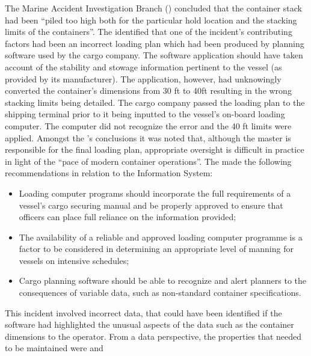 The Marine Accident Investigation Branch () concluded that the container stack had been ``piled too high both for the particular hold location and the stacking limits of the containers''. The  identified that one of the incident’s contributing factors had been an incorrect loading plan which had been produced by planning software used by the cargo company. The software application should have taken account of the stability and stowage information pertinent to the vessel (as provided by its manufacturer). The application, however, had unknowingly converted the container’s dimensions from 30 ft to 40ft resulting in the wrong stacking limits being detailed. The cargo company passed the loading plan to the shipping terminal prior to it being inputted to the vessel’s on-board loading computer. The computer did not recognize the error and the 40 ft limits were applied. Amongst the ’s conclusions it was noted that, although the master is responsible for the final loading plan, appropriate oversight is difficult in practice in light of the ``pace of modern container operations''. The  made the following recommendations in relation to the Information System:
\begin{itemize}
\item Loading computer programs should incorporate the full requirements of a vessel’s cargo securing manual and be properly approved to ensure that officers can place full reliance on the information provided;
\item The availability of a reliable and approved loading computer programme is a factor to be considered in determining an appropriate level of manning for vessels on intensive schedules; 
\item Cargo planning software should be able to recognize and alert planners to the consequences of variable data, such as non-standard container specifications.
\end{itemize}

This incident involved incorrect data, that could have been identified if the software had highlighted the unusual aspects of the data such as the container dimensions to the operator. From a data perspective, the properties that needed to be maintained were  and 

